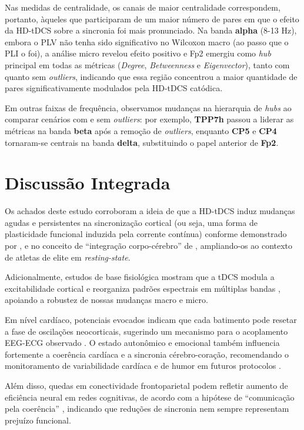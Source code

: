Nas medidas de centralidade, os canais de maior centralidade correspondem, portanto, àqueles que participaram de um maior número de pares em que o efeito da HD-tDCS sobre a sincronia foi mais pronunciado. Na banda \textbf{alpha} (8-13 Hz), embora o PLV não tenha sido significativo no Wilcoxon macro (ao passo que o PLI o foi), a análise micro revelou efeito positivo e Fp2 emergiu como \textit{hub} principal em todas as métricas (\textit{Degree}, \textit{Betweenness} e \textit{Eigenvector}), tanto com quanto sem \textit{outliers}, indicando que essa região concentrou a maior quantidade de pares significativamente modulados pela HD-tDCS catódica.

Em outras faixas de frequência, observamos mudanças na hierarquia de \textit{hubs} ao comparar cenários com e sem \textit{outliers}: por exemplo, \textbf{TPP7h} passou a liderar as métricas na banda \textbf{beta} após a remoção de \textit{outliers}, enquanto \textbf{CP5} e \textbf{CP4} tornaram-se centrais na banda \textbf{delta}, substituindo o papel anterior de \textbf{Fp2}.

\section{Discussão Integrada}
Os achados deste estudo corroboram a ideia de que a HD-tDCS induz mudanças agudas e persistentes na sincronização cortical (ou seja, uma forma de plasticidade funcional induzida pela corrente contínua) conforme demonstrado por , e no conceito de ``integração corpo-cérebro'' de , ampliando-os ao contexto de atletas de elite em \textit{resting-state}.

Adicionalmente, estudos de base fisiológica mostram que a tDCS modula a excitabilidade cortical e reorganiza padrões espectrais em múltiplas bandas \cite{nitsche2000excitability, stagg2011physiological}, apoiando a robustez de nossas mudanças macro e micro.

Em nível cardíaco, potenciais evocados indicam que cada batimento pode resetar a fase de oscilações neocorticais, sugerindo um mecanismo para o acoplamento EEG-ECG observado \cite{purpura1965intracellular}. O estado autonômico e emocional também influencia fortemente a coerência cardíaca e a sincronia cérebro-coração, recomendando o monitoramento de variabilidade cardíaca e de humor em futuros protocolos \cite{okano2013estimulacao}.

Além disso, quedas em conectividade frontoparietal podem refletir aumento de eficiência neural em redes cognitivas, de acordo com a hipótese de ``comunicação pela coerência'' \cite{fries2015rhythms}, indicando que reduções de sincronia nem sempre representam prejuízo funcional.

